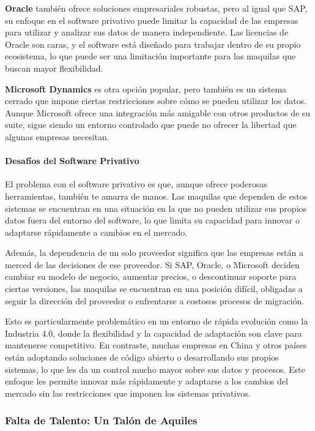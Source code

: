 \documentclass[
  10pt,
  letterpaper,
]{book}
\let\oldparagraph\paragraph
\renewcommand{\paragraph}[1]{\oldparagraph{#1}\mbox{}}
\begin{document}
\textbf{Oracle} también ofrece soluciones empresariales robustas, pero
al igual que SAP, su enfoque en el software privativo puede limitar la
capacidad de las empresas para utilizar y analizar sus datos de manera
independiente. Las licencias de Oracle son caras, y el software está
diseñado para trabajar dentro de su propio ecosistema, lo que puede ser
una limitación importante para las maquilas que buscan mayor
flexibilidad.

\textbf{Microsoft Dynamics} es otra opción popular, pero también es un
sistema cerrado que impone ciertas restricciones sobre cómo se pueden
utilizar los datos. Aunque Microsoft ofrece una integración más amigable
con otros productos de su suite, sigue siendo un entorno controlado que
puede no ofrecer la libertad que algunas empresas necesitan.

\paragraph{Desafíos del Software
Privativo}\label{desafuxedos-del-software-privativo}

El problema con el software privativo es que, aunque ofrece poderosas
herramientas, también te amarra de manos. Las maquilas que dependen de
estos sistemas se encuentran en una situación en la que no pueden
utilizar sus propios datos fuera del entorno del software, lo que limita
su capacidad para innovar o adaptarse rápidamente a cambios en el
mercado.

Además, la dependencia de un solo proveedor significa que las empresas
están a merced de las decisiones de ese proveedor. Si SAP, Oracle, o
Microsoft deciden cambiar su modelo de negocio, aumentar precios, o
descontinuar soporte para ciertas versiones, las maquilas se encuentran
en una posición difícil, obligadas a seguir la dirección del proveedor o
enfrentarse a costosos procesos de migración.

Esto es particularmente problemático en un entorno de rápida evolución
como la Industria 4.0, donde la flexibilidad y la capacidad de
adaptación son clave para mantenerse competitivo. En contraste, muchas
empresas en China y otros países están adoptando soluciones de código
abierto o desarrollando sus propios sistemas, lo que les da un control
mucho mayor sobre sus datos y procesos. Este enfoque les permite innovar
más rápidamente y adaptarse a los cambios del mercado sin las
restricciones que imponen los sistemas privativos.

\subsubsection{Falta de Talento: Un Talón de
Aquiles}\label{falta-de-talento-un-taluxf3n-de-aquiles}
\end{document}
